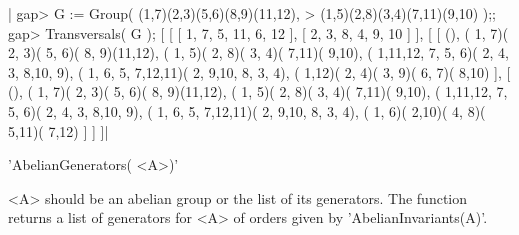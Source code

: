 |    gap> G := Group( (1,7)(2,3)(5,6)(8,9)(11,12),
    >                (1,5)(2,8)(3,4)(7,11)(9,10) );;
    gap> Transversals( G );
    [ [ [ 1, 7, 5, 11, 6, 12 ], [ 2, 3, 8, 4, 9, 10 ] ],
      [ [ (), ( 1, 7)( 2, 3)( 5, 6)( 8, 9)(11,12),
              ( 1, 5)( 2, 8)( 3, 4)( 7,11)( 9,10),
              ( 1,11,12, 7, 5, 6)( 2, 4, 3, 8,10, 9),
              ( 1, 6, 5, 7,12,11)( 2, 9,10, 8, 3, 4),
              ( 1,12)( 2, 4)( 3, 9)( 6, 7)( 8,10) ],
          [ (), ( 1, 7)( 2, 3)( 5, 6)( 8, 9)(11,12),
              ( 1, 5)( 2, 8)( 3, 4)( 7,11)( 9,10),
              ( 1,11,12, 7, 5, 6)( 2, 4, 3, 8,10, 9),
              ( 1, 6, 5, 7,12,11)( 2, 9,10, 8, 3, 4),
              ( 1, 6)( 2,10)( 4, 8)( 5,11)( 7,12) ] ] ]|

%
%

'AbelianGenerators( <A>)'

<A>  should be an abelian group or the list of its generators. The function
returns a list of generators for <A> of orders given by
'AbelianInvariants(A)'.

